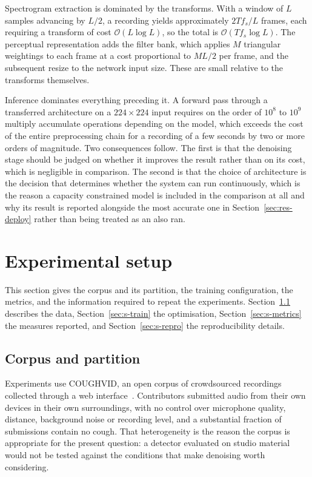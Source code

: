 Spectrogram extraction is dominated by the transforms. With a window of
$L$ samples advancing by $L/2$, a recording yields approximately
$2 T f_s / L$ frames, each requiring a transform of cost
$\mathcal{O}(L \log L)$, so the total is $\mathcal{O}(T f_s \log L)$. The
perceptual representation adds the filter bank, which applies $M$ triangular
weightings to each frame at a cost proportional to $M L / 2$ per frame, and
the subsequent resize to the network input size. These are small relative to
the transforms themselves.

Inference dominates everything preceding it. A forward pass through a
transferred architecture on a $224 \times 224$ input requires on the order of
$10^8$ to $10^9$ multiply accumulate operations depending on the model, which
exceeds the cost of the entire preprocessing chain for a recording of a few
seconds by two or more orders of magnitude. Two consequences follow. The
first is that the denoising stage should be judged on whether it improves the
result rather than on its cost, which is negligible in comparison. The second
is that the choice of architecture is the decision that determines whether the
system can run continuously, which is the reason a capacity constrained model
is included in the comparison at all and why its result is reported alongside
the most accurate one in Section~\ref{sec:res-deploy} rather than being
treated as an also ran.

\section{Experimental setup}\label{sec:setup}

This section gives the corpus and its partition, the training configuration,
the metrics, and the information required to repeat the experiments.
Section~\ref{sec:s-data} describes the data, Section~\ref{sec:s-train} the
optimisation, Section~\ref{sec:s-metrics} the measures reported, and
Section~\ref{sec:s-repro} the reproducibility details.

\subsection{Corpus and partition}\label{sec:s-data}

Experiments use COUGHVID, an open corpus of crowdsourced recordings collected
through a web interface~\cite{orlandic2021}. Contributors submitted audio from
their own devices in their own surroundings, with no control over microphone
quality, distance, background noise or recording level, and a substantial
fraction of submissions contain no cough. That heterogeneity is the reason the
corpus is appropriate for the present question: a detector evaluated on
studio material would not be tested against the conditions that make
denoising worth considering.


